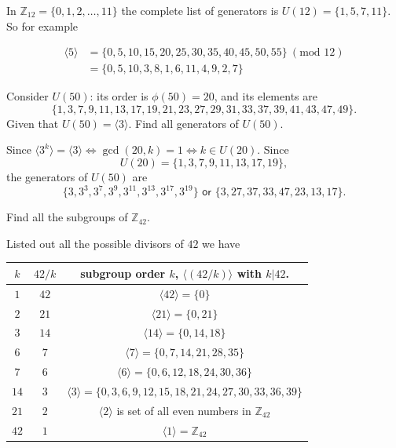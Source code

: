 \begin{example}
    In $\mathbb{Z}_{12} = \{0, 1, 2, \ldots, 11\}$ the complete list of generators is $U(12) = \{1, 5, 7, 11\}$. So for example 

    \begin{align*}
        \langle 5 \rangle &= \{ 0, 5, 10, 15, 20, 25, 30, 35, 40, 45, 50, 55 \} \> (\text{mod } 12)\\ 
        &= \{ 0, 5, 10, 3, 8, 1, 6, 11, 4, 9, 2, 7\}
    \end{align*}
\end{example}

\begin{example}
    Consider $U(50)$: its order is $\phi(50) = 20$, and its elements are 
    \[
        \{ 1, 3, 7, 9, 11, 13, 17, 19, 21, 23, 27, 29, 31, 33, 37, 39, 41, 43, 47, 49\}.
    \]
    Given that $U(50) = \langle 3 \rangle$. Find all generators of $U(50)$.
\end{example}
\begin{solution}
    Since $\langle 3^k \rangle = \langle 3 \rangle \Leftrightarrow \gcd(20, k) = 1 \Leftrightarrow k \in U(20)$. Since 
    \[
        U(20) = \{ 1, 3, 7, 9, 11, 13, 17, 19 \},
    \]
    the generators of $U(50)$ are 
    \[
        \{3, 3^3, 3^7, 3^9, 3^{11}, 3^{13}, 3^{17}, 3^{19} \} \textsf{ or }
        \{3, 27, 37, 33, 47, 23, 13, 17\}.
    \]
\end{solution}

\begin{example}
    Find all the subgroups of $\mathbb{Z}_{42}$.
\end{example}
\begin{solution}
    Listed out all the possible divisors of $42$ we have 

    \begin{center}
        \begin{tabular}{c|c|c}
            $k$ & $42/k$ & subgroup order $k$, $\langle (42/k) \rangle$ with $k|42$.\\
            \hline
            $1$ & $42$ & $\langle 42 \rangle = \{0\}$\\[0.3em]
            \hline
            $2$ & $21$ & $\langle 21 \rangle = \{0, 21\}$\\[0.3em]
            \hline
            $3$ & $14$ & $\langle 14 \rangle = \{0, 14, 18\}$\\[0.3em]
            \hline
            $6$ & $7$ & $\langle 7 \rangle = \{0, 7, 14, 21, 28, 35 \}$\\[0.3em]
            \hline
            $7$ & $6$ & $\langle 6 \rangle = \{0, 6, 12, 18, 24, 30, 36 \}$\\[0.3em]
            \hline
            $14$ & $3$ & $\langle 3 \rangle = \{0, 3, 6, 9, 12, 15, 18, 21, 24, 27, 30, 33, 36, 39 \}$\\[0.3em]
            \hline
            $21$ & $2$ & $\langle 2 \rangle$ is set of all even numbers in $\mathbb{Z}_{42}$\\[0.3em]
            \hline 
            $42$ & $1$ & $\langle 1 \rangle = \mathbb{Z}_{42}$
        \end{tabular}
    \end{center}
\end{solution}

